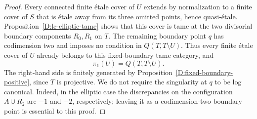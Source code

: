 \begin{proof}
Every connected finite \'etale cover of $U$ extends by normalization
to a finite cover of $S$ that is \'etale away from its three
omitted points, hence quasi-\'etale.  Proposition~\ref{D:lc-elliptic-tame}
shows that this cover is tame at the two divisorial boundary
components $R_0,R_1$ on $T$.  The remaining boundary point $q$
has codimension two and imposes no condition in $Q(T,T\setminus U)$.
Thus every finite \'etale cover of $U$ already belongs to this
fixed-boundary tame category, and
\[
 \pi_1(U)=Q(T,T\setminus U).
\]
The right-hand side is finitely generated by
Proposition~\ref{D:fixed-boundary-positive}, since $T$ is projective.
We do not require the singularity at $q$ to be log canonical.
Indeed, in the elliptic case the discrepancies on the configuration
$A\cup R_2$ are $-1$ and $-2$, respectively; leaving it as a
codimension-two boundary point is essential to this proof.
\end{proof}
